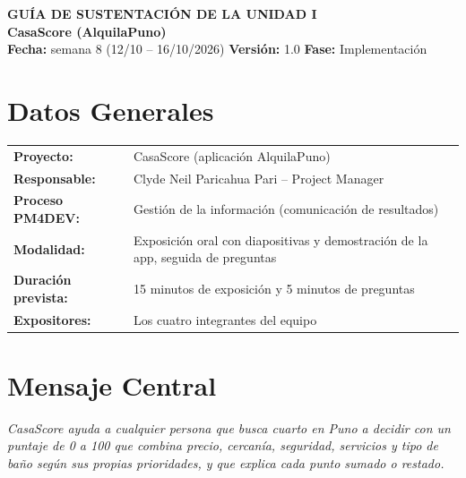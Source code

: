 \documentclass[11pt,a4paper]{article}
\begin{document}
\begin{center}
    {\Large \textbf{\textcolor{AzulUNA}{GUÍA DE SUSTENTACIÓN DE LA UNIDAD I}}}\\[3pt]
    {\normalsize \textbf{CasaScore (AlquilaPuno)}}\\[4pt]
    \footnotesize \textbf{Fecha:} semana 8 (12/10 -- 16/10/2026) \quad \textbar\quad \textbf{Versión:} 1.0 \quad \textbar\quad \textbf{Fase:} Implementación
\end{center}

\vspace{0.1cm}

\section{Datos Generales}
\noindent\begin{tabularx}{\textwidth}{@{}P{4.2cm} L@{}}
\toprule
\textbf{Proyecto:} & CasaScore (aplicación AlquilaPuno) \\
\textbf{Responsable:} & Clyde Neil Paricahua Pari -- Project Manager \\
\textbf{Proceso PM4DEV:} & Gestión de la información (comunicación de resultados) \\
\textbf{Modalidad:} & Exposición oral con diapositivas y demostración de la app, seguida de preguntas \\
\textbf{Duración prevista:} & 15 minutos de exposición y 5 minutos de preguntas \\
\textbf{Expositores:} & Los cuatro integrantes del equipo \\
\bottomrule
\end{tabularx}

\section{Mensaje Central}
\begin{center}
\begin{minipage}{0.88\textwidth}\centering\itshape
CasaScore ayuda a cualquier persona que busca cuarto en Puno a decidir con un puntaje de 0 a 100 que combina precio, cercanía, seguridad, servicios y tipo de baño según sus propias prioridades, y que explica cada punto sumado o restado.
\end{minipage}
\end{center}

\end{document}
